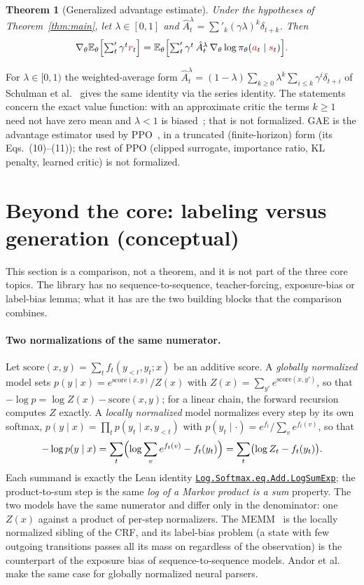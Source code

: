 \documentclass[11pt,a4paper]{article}
\newcommand{\lmod}[2]{\href{http://www.lemma.cn/lean/?module=#2}{\nolinkurl{#1}}}
\newtheorem{theorem}{Theorem}[section]
\newcommand{\E}{\mathbb{E}}
\newcommand{\rv}[1]{{\color{red}#1}}       %
\newcommand{\sv}{\rv{s}}
\newcommand{\av}{\rv{a}}
\newcommand{\rw}{\rv{r}}
\newcommand{\grad}{\nabla_{\theta}}
\newcommand{\tsum}{\textstyle\sum'}
\begin{document}
\begin{theorem}[Generalized advantage estimate]
\label{thm:gae}
Under the hypotheses of Theorem~\ref{thm:main}, let $\lambda\in[0,1]$ and $\hat A^{\lambda}_t=\tsum_k(\gamma\lambda)^k\delta_{t+k}$.
Then
\[
\grad\E_\theta\Bigl[\tsum_t\gamma^t\rw_t\Bigr]=\E_\theta\Bigl[\tsum_t\gamma^t\,\hat A^{\lambda}_t\,\grad\log\pi_\theta(\av_t\mid\sv_t)\Bigr].
\]
\end{theorem}
For $\lambda\in[0,1)$ the weighted-average form $\hat A^{\lambda}_t=(1-\lambda)\sum_{k\ge0}\lambda^k\sum_{i\le k}\gamma^i\delta_{t+i}$ of Schulman et al.~\cite{schulman2016gae} gives the same identity via the series identity.
The statements concern the exact value function: with an approximate critic the terms $k\ge1$ need not have zero mean and $\lambda<1$ is biased~\cite{schulman2016gae}; that is not formalized.
GAE is the advantage estimator used by PPO~\cite{schulman2017ppo}, in a truncated (finite-horizon) form (its Eqs.~(10)--(11)); the rest of PPO (clipped surrogate, importance ratio, KL penalty, learned critic) is not formalized.

\section{Beyond the core: labeling versus generation (conceptual)}
\label{sec:gen}

This section is a comparison, not a theorem, and it is not part of the three core topics.
The library has no sequence-to-sequence, teacher-forcing, exposure-bias or label-bias lemma; what it has are the two building blocks that the comparison combines.

\paragraph{Two normalizations of the same numerator.}
Let $\mathrm{score}(x,y)=\sum_tf_t(y_{<t},y_t;x)$ be an additive score.
A \emph{globally normalized} model sets $p(y\mid x)=e^{\mathrm{score}(x,y)}/Z(x)$ with $Z(x)=\sum_{y'}e^{\mathrm{score}(x,y')}$, so that $-\log p=\log Z(x)-\mathrm{score}(x,y)$; for a linear chain, the forward recursion computes $Z$ exactly.
A \emph{locally normalized} model normalizes every step by its own softmax, $p(y\mid x)=\prod_tp(y_t\mid x,y_{<t})$ with $p(y_t\mid\cdot)=e^{f_t}/\sum_ve^{f_t(v)}$, so that
\[
-\log p(y\mid x)=\sum_t\Bigl(\log\sum_ve^{f_t(v)}-f_t(y_t)\Bigr)=\sum_t\bigl(\log Z_t-f_t(y_t)\bigr).
\]
Each summand is exactly the Lean identity \lmod{Log.Softmax.eq.Add.LogSumExp}{Tensor.Log.Softmax.eq.Add.LogSumExp}; the product-to-sum step is the same \emph{log of a Markov product is a sum} property.
The two models have the same numerator and differ only in the denominator: one $Z(x)$ against a product of per-step normalizers.
The MEMM~\cite{mccallum2000memm} is the locally normalized sibling of the CRF, and its label-bias problem (a state with few outgoing transitions passes all its mass on regardless of the observation) is the counterpart of the exposure bias of sequence-to-sequence models.
Andor et al.~\cite{andor2016global} make the same case for globally normalized neural parsers.
\end{document}
